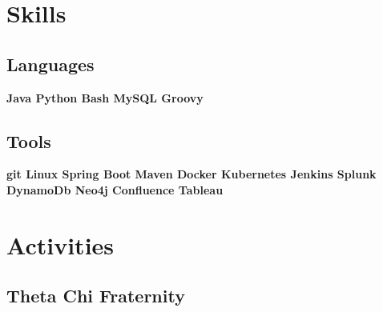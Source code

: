 \documentclass[]{deedy-resume-openfont}
\begin{document}
\begin{minipage}[t]{0.30\textwidth}



\section{Skills}
\subsection{Languages}
\textbf{Java \textbullet{} Python \textbullet{} Bash \textbullet{} MySQL
Groovy\\}

\vspace{\topsep} %

\subsection{Tools}
\textbf{git \textbullet{} Linux \textbullet{} Spring Boot \textbullet{} Maven
Docker \textbullet{} Kubernetes  \textbullet{} Jenkins
Splunk \textbullet{} DynamoDb \textbullet{} Neo4j 
Confluence \textbullet{} Tableau}
\sectionsep


\section{Activities}

\subsection{Theta Chi Fraternity}


\end{minipage}
\end{document}
